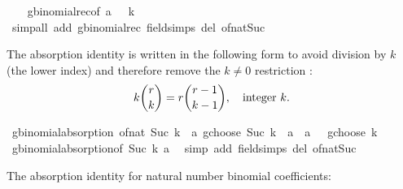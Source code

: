 \begin{isabellebody}
%
\isadelimproof
\ \ %
\endisadelimproof
%
\isatagproof
{}\isamarkupfalse%
\ gbinomial{\isacharunderscore}{\kern0pt}rec{\isacharbrackleft}{\kern0pt}of\ {\isachardoublequoteopen}a\ {\isacharminus}{\kern0pt}\ {}{\isachardoublequoteclose}\ {\isachardoublequoteopen}k\ {\isacharminus}{\kern0pt}\ {}{\isachardoublequoteclose}{\isacharbrackright}{\kern0pt}\isanewline
\ \ \isamarkupfalse%
\ {\isacharparenleft}{\kern0pt}simp{\isacharunderscore}{\kern0pt}all\ add{\isacharcolon}{\kern0pt}\ gbinomial{\isacharunderscore}{\kern0pt}rec\ field{\isacharunderscore}{\kern0pt}simps\ del{\isacharcolon}{\kern0pt}\ of{\isacharunderscore}{\kern0pt}nat{\isacharunderscore}{\kern0pt}Suc{\isacharparenright}{\kern0pt}%
\endisatagproof
{\isafoldproof}%
%
\isadelimproof
%
\endisadelimproof
%
\begin{isamarkuptext}%
The absorption identity is written in the following form to avoid
division by $k$ (the lower index) and therefore remove the $k \neq 0$
restriction \cite[p.~157]{GKP_CM}:
\[
k{r \choose k} = r{r - 1 \choose k - 1}, \quad \textnormal{integer } k.
\]%
\end{isamarkuptext}\isamarkuptrue%
\isamarkupfalse%
\ gbinomial{\isacharunderscore}{\kern0pt}absorption{\isacharcolon}{\kern0pt}\ {\isachardoublequoteopen}of{\isacharunderscore}{\kern0pt}nat\ {\isacharparenleft}{\kern0pt}Suc\ k{\isacharparenright}{\kern0pt}\ {\isacharasterisk}{\kern0pt}\ {\isacharparenleft}{\kern0pt}a\ gchoose\ Suc\ k{\isacharparenright}{\kern0pt}\ {\isacharequal}{\kern0pt}\ a\ {\isacharasterisk}{\kern0pt}\ {\isacharparenleft}{\kern0pt}{\isacharparenleft}{\kern0pt}a\ {\isacharminus}{\kern0pt}\ {}{\isacharparenright}{\kern0pt}\ gchoose\ k{\isacharparenright}{\kern0pt}{\isachardoublequoteclose}\isanewline
%
\isadelimproof
\ \ %
\endisadelimproof
%
\isatagproof
{}\isamarkupfalse%
\ gbinomial{\isacharunderscore}{\kern0pt}absorption{\isacharprime}{\kern0pt}{\isacharbrackleft}{\kern0pt}of\ {\isachardoublequoteopen}Suc\ k{\isachardoublequoteclose}\ a{\isacharbrackright}{\kern0pt}\ \isamarkupfalse%
\ {\isacharparenleft}{\kern0pt}simp\ add{\isacharcolon}{\kern0pt}\ field{\isacharunderscore}{\kern0pt}simps\ del{\isacharcolon}{\kern0pt}\ of{\isacharunderscore}{\kern0pt}nat{\isacharunderscore}{\kern0pt}Suc{\isacharparenright}{\kern0pt}%
\endisatagproof
{\isafoldproof}%
%
\isadelimproof
%
\endisadelimproof
%
\begin{isamarkuptext}%
The absorption identity for natural number binomial coefficients:%

\end{isamarkuptext}
\end{isabellebody}

